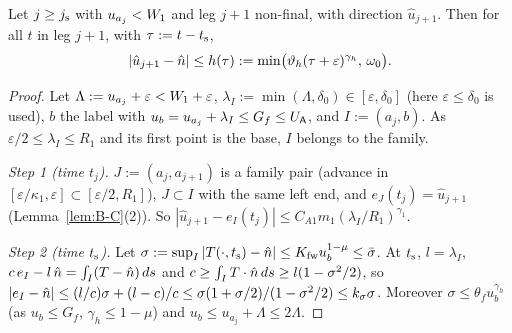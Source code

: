 \begin{lemma}\label{lem:T3-H}
Let $j\ge j_{\mathrm s}$ with $u_{a_j}<W_1$ and leg $j+1$ non-final, with direction $\hat u_{j+1}$. Then for all $t$ in leg $j+1$, with
$\tau:=t-t_{\mathrm s}$,
\[
|\hat u_{j+1}-\hat n|\le h(\tau):=\min\bigl(\vartheta_h(\tau+\varepsilon)^{\gamma_h},\,\omega_0\bigr).
\]
\end{lemma}
\begin{proof}
Let $\Lambda:=u_{a_j}+\varepsilon<W_1+\varepsilon$, $\lambda_I:=\min(\Lambda,\delta_0)\in[\varepsilon,\delta_0]$ (here
$\varepsilon\le\delta_0$ is used), $b$ the label with $u_b=u_{a_j}+\lambda_I\le G_f\le U_{\mathsf A}$, and $I:=(a_j,b)$. As
$\varepsilon/2\le\lambda_I\le R_1$ and its first point is the base, $I$ belongs to the family.

\emph{Step 1 (time $t_j$).} $J:=(a_j,a_{j+1})$ is a family pair (advance in $[\varepsilon/\kappa_1,\varepsilon]\subset[\varepsilon/2,R_1]$),
$J\subset I$ with the same left end, and $e_J(t_j)=\hat u_{j+1}$ (Lemma~\ref{lem:B-C}(2)). So
$|\hat u_{j+1}-e_I(t_j)|\le C_{A1}m_1(\lambda_I/R_1)^{\gamma_1}$.

\emph{Step 2 (time $t_{\mathrm s}$).} Let $\sigma:=\sup_I|T(\cdot,t_{\mathrm s})-\hat n|\le K_{\mathrm{fw}}u_b^{1-\mu}\le\bar\sigma$. At $t_{\mathrm s}$, $l=\lambda_I$,
$c\,e_I-l\,\hat n=\int_I(T-\hat n)\,ds$ and $c\ge\int_IT\cdot\hat n\,ds\ge l(1-\sigma^2/2)$, so
$|e_I-\hat n|\le(l/c)\sigma+(l-c)/c\le\sigma(1+\sigma/2)/(1-\sigma^2/2)\le k_\sigma\sigma$. Moreover
$\sigma\le\theta_fu_b^{\gamma_h}$ (as $u_b\le G_f$, $\gamma_h\le1-\mu$) and $u_b\le u_{a_j}+\Lambda\le2\Lambda$.


\end{proof}
